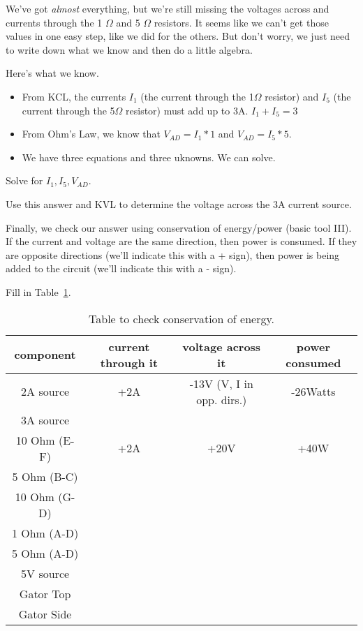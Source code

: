 We've got \emph{almost} everything, but we're still missing the voltages across and currents through the 1 $\Omega$ and 5 $\Omega$ resistors. It seems like we can't get those values in one easy step, like we did for the others. But don't worry, we just need to write down what we know and then do a little algebra.
\par

Here's what we know.
\begin{itemize}
\item From KCL, the currents $I_1$ (the current through the 1$\Omega$ resistor) and $I_5$ (the current through the 5$\Omega$ resistor) must add up to 3A. $I_1+I_5=3$
\item From Ohm's Law, we know that $V_{AD}=I_1*1$ and $V_{AD}=I_5*5$. 
\item We have three equations and three uknowns. We can solve. 
\end{itemize} 

\begin{blevel}
Solve for $I_1,I_5,V_{AD}$. 
\end{blevel}

\begin{clevel}
Use this answer and KVL to determine the voltage across the 3A current source.
\end{clevel}

Finally, we check our answer using conservation of energy/power (basic tool III). If the current and voltage are the same direction, then power is consumed. If they are opposite directions (we'll indicate this with a + sign), then power is being added to the circuit (we'll indicate this with a - sign).

\begin{clevel}
Fill in Table~\ref{F:3CKT3}.
\end{clevel}

\begin{table}[H]
\begin{center}
\begin{tabular}{|c|c|c|c|} \hline
component &	current through it	& voltage across it	& power consumed \\ \hline
2A source	&+2A			&-13V (V, I in opp. dirs.)	&-26Watts\\ \hline
3A source	&			&	&	\\ \hline
10 Ohm (E-F)	&+2A			&+20V	&+40W	\\ \hline
5 Ohm (B-C)	&			&	&	\\ \hline
10 Ohm (G-D)	&			&	&	\\ \hline
1 Ohm (A-D)	&			&	&	\\ \hline
5 Ohm (A-D)	&			&	&	\\ \hline
5V source	&			&	&	\\ \hline
Gator Top	&			&	&	\\ \hline
Gator Side	&			&	&	\\ \hline
\end{tabular}
\caption{Table to check conservation of energy.}
\label{F:3CKT3}
\end{center}
\end{table}

